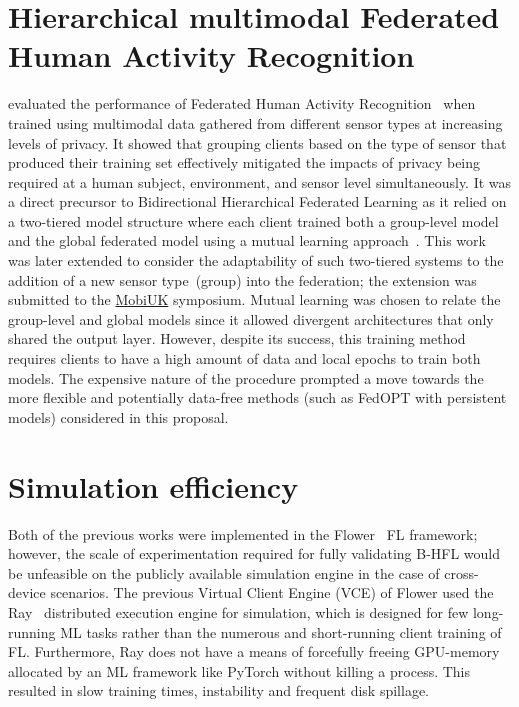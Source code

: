 \section{Hierarchical multimodal Federated Human Activity Recognition}
\citet{OperaWorkshop} evaluated the performance of Federated Human Activity Recognition~\citep{HARusingFL_2018} when trained using multimodal data gathered from different sensor types at increasing levels of privacy. It showed that grouping clients based on the type of sensor that produced their training set effectively mitigated the impacts of privacy being required at a human subject, environment, and sensor level simultaneously. It was a direct precursor to Bidirectional Hierarchical Federated Learning as it relied on a two-tiered model structure where each client trained both a group-level model and the global federated model using a mutual learning approach~\citep{DeepMutualLearning}. This work was later extended to consider the adaptability of such two-tiered systems to the addition of a new sensor type~(group) into the federation; the extension was submitted to the \href{https://mobiuk.org/2023}{MobiUK} symposium. Mutual learning was chosen to relate the group-level and global models since it allowed divergent architectures that only shared the output layer. However, despite its success, this training method requires clients to have a high amount of data and local epochs to train both models. The expensive nature of the procedure prompted a move towards the more flexible and potentially data-free methods (such as FedOPT with persistent models) considered in this proposal.

\section{Simulation efficiency}
Both of the previous works were implemented in the Flower~\citep{Flower} FL framework; however, the scale of experimentation required for fully validating B-HFL would be unfeasible on the publicly available simulation engine in the case of cross-device scenarios. The previous Virtual Client Engine (VCE) of Flower used the Ray~\citep{RAY} distributed execution engine for simulation, which is designed for few long-running ML tasks rather than the numerous and short-running client training of FL\@. Furthermore, Ray does not have a means of forcefully freeing GPU-memory allocated by an ML framework like PyTorch without killing a process. This resulted in slow training times, instability and frequent disk spillage.

